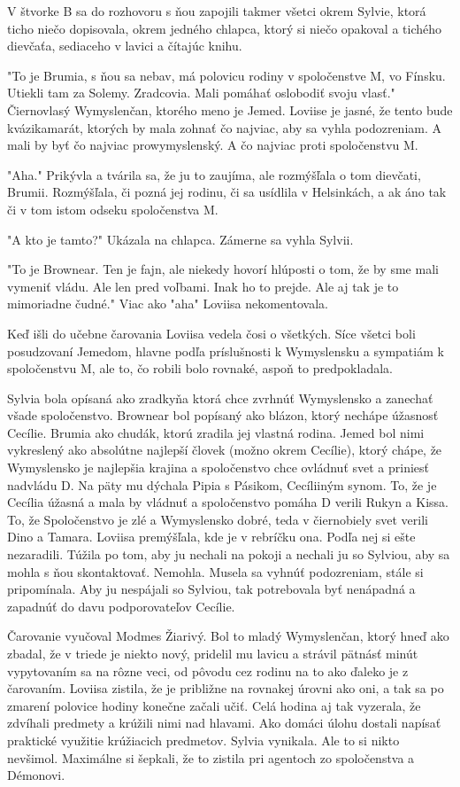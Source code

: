\documentclass{book}
\begin{document}
V štvorke B sa do rozhovoru s ňou zapojili takmer všetci okrem Sylvie, ktorá ticho niečo dopisovala, okrem jedného chlapca, ktorý si niečo opakoval a tichého dievčaťa, sediaceho v lavici a čítajúc knihu.

"$ $To je Brumia, s ňou sa nebav, má polovicu rodiny v spoločenstve M, vo Fínsku. Utiekli tam za Solemy. Zradcovia. Mali pomáhať oslobodiť svoju vlasť."$ $ Čiernovlasý Wymyslenčan, ktorého meno je Jemed. Loviise je jasné, že tento bude kvázikamarát, ktorých by mala zohnať čo najviac, aby sa vyhla podozreniam. A mali by byť čo najviac prowymyslenský. A čo najviac proti spoločenstvu M.

"$ $Aha."$ $ Prikývla a tvárila sa, že ju to zaujíma, ale rozmýšľala o tom dievčati, Brumii. Rozmýšľala, či pozná jej rodinu, či sa usídlila v Helsinkách, a ak áno tak či v tom istom odseku spoločenstva M.

"$ $A kto je tamto?"$ $ Ukázala na chlapca. Zámerne sa vyhla Sylvii.

"$ $To je Brownear. Ten je fajn, ale niekedy hovorí hlúposti o tom, že by sme mali vymeniť vládu. Ale len pred voľbami. Inak ho to prejde. Ale aj tak je to mimoriadne čudné."$ $ Viac ako "$ $aha"$ $ Loviisa nekomentovala.

Keď išli do učebne čarovania Loviisa vedela čosi o všetkých. Síce všetci boli posudzovaní Jemedom, hlavne podľa príslušnosti k Wymyslensku a sympatiám k spoločenstvu M, ale to, čo robili bolo rovnaké, aspoň to predpokladala.

Sylvia bola opísaná ako zradkyňa ktorá chce zvrhnúť Wymyslensko a zanechať všade spoločenstvo. Brownear bol popísaný ako blázon, ktorý nechápe úžasnosť Cecílie. Brumia ako chudák, ktorú zradila jej vlastná rodina. Jemed bol nimi vykreslený ako absolútne najlepší človek (možno okrem Cecílie), ktorý chápe, že Wymyslensko je najlepšia krajina a spoločenstvo chce ovládnuť svet a priniesť nadvládu D. Na päty mu dýchala Pipia s Pásikom, Cecíliiným synom. To, že je Cecília úžasná a mala by vládnuť a spoločenstvo pomáha D verili Rukyn a Kissa. To, že Spoločenstvo je zlé a Wymyslensko dobré, teda v čiernobiely svet verili Dino a Tamara. Loviisa premýšľala, kde je v rebríčku ona. Podľa nej si ešte nezaradili. Túžila po tom, aby ju nechali na pokoji a nechali ju so Sylviou, aby sa mohla s ňou skontaktovať. Nemohla. Musela sa vyhnúť podozreniam, stále si pripomínala. Aby ju nespájali so Sylviou, tak potrebovala byť nenápadná a zapadnúť do davu podporovateľov Cecílie.

Čarovanie vyučoval Modmes Žiarivý. Bol to mladý Wymyslenčan, ktorý hneď ako zbadal, že v triede je niekto nový, pridelil mu lavicu a strávil pätnásť minút vypytovaním sa na rôzne veci, od pôvodu cez rodinu na to ako ďaleko je z čarovaním. Loviisa zistila, že je približne na rovnakej úrovni ako oni, a tak sa po zmarení polovice hodiny konečne začali učiť. Celá hodina aj tak vyzerala, že zdvíhali predmety a krúžili nimi nad hlavami. Ako domáci úlohu dostali napísať praktické využitie krúžiacich predmetov. Sylvia vynikala. Ale to si nikto nevšimol. Maximálne si šepkali, že to zistila pri agentoch zo spoločenstva a Démonovi.
\end{document}
